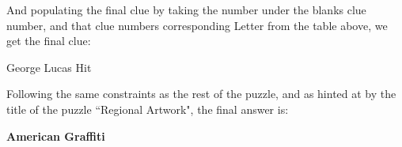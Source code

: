 \documentclass{article}
\begin{document}
\quad

And populating the final clue by taking the number under the blanks clue number, and that clue numbers corresponding Letter from the table above, we get the final clue:

\quad

George Lucas Hit 

\quad

Following the same constraints as the rest of the puzzle, and as hinted at by the title of the puzzle ``Regional Artwork", the final answer is:

\quad

\textbf{American Graffiti}
\end{document}
